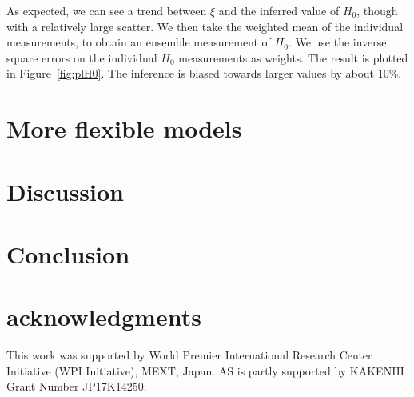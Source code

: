 \documentclass[usenatbib]{mnras}
\def\Fref#1{Figure~\ref{#1}\xspace}
\begin{document}
%
As expected, we can see a trend between $\xi$ and the inferred value of $H_0$, though with a relatively large scatter.
We then take the weighted mean of the individual measurements, to obtain an ensemble measurement of $H_0$. We use the inverse square errors on the individual $H_0$ measurements as weights.
The result is plotted in \Fref{fig:plH0}. The inference is biased towards larger values by about 10\%.

\section{More flexible models}

\section{Discussion}

\section{Conclusion}

\section*{acknowledgments}
This work was supported by World Premier International Research Center Initiative (WPI Initiative), MEXT, Japan.
AS is partly supported by KAKENHI Grant Number JP17K14250. 


\end{document}
